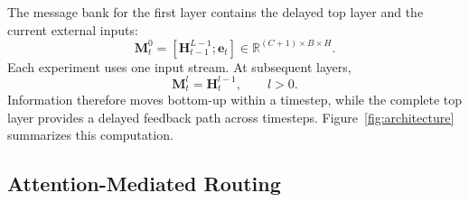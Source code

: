 \documentclass[letterpaper,twoside]{article}
\begin{document}
The message bank for the first layer contains the delayed top layer and the current external inputs:
\begin{equation}
    \mathbf{M}_t^0 =
    [\mathbf{H}_{t-1}^{L-1}; \mathbf{e}_t]
    \in \mathbb{R}^{(C+1) \times B \times H}.
\end{equation}
Each experiment uses one input stream. At subsequent layers,
\begin{equation}
    \mathbf{M}_t^l = \mathbf{H}_t^{l-1}, \qquad l > 0.
\end{equation}
Information therefore moves bottom-up within a timestep, while the complete top layer provides a delayed feedback path across timesteps. Figure~\ref{fig:architecture} summarizes this computation.

\subsection{Attention-Mediated Routing}
\end{document}
